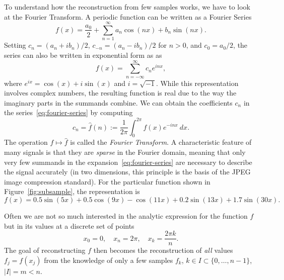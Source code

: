 \documentclass{article}
\begin{document}
To understand how the reconstruction from few samples works, we have to look at the Fourier Transform. A periodic function can be written as a Fourier Series
\begin{equation*}
 f(x) = \frac{a_0}{2}+\sum_{n=1}^\infty a_n\cos(nx)+b_n\sin(nx).
\end{equation*}
Setting $c_n=(a_n+ib_n)/2$, $c_{-n}=(a_n-ib_n)/2$ for $n>0$, and $c_0=a_0/2$, the series can also be written in exponential form as as
\begin{equation}\label{eq:fourier-series}\tag{1}
 f(x) = \sum_{n=-\infty}^\infty c_n e^{inx},
\end{equation}
where $e^{ix} = \cos(x)+i\sin(x)$ and $i=\sqrt{-1}$. While this representation involves complex numbers, the resulting function is real due to the way the imaginary parts in the summands combine. 
We can obtain the coefficients $c_n$ in the series~\eqref{eq:fourier-series} by computing
\begin{equation*}
 c_n = \hat{f}(n) := \frac{1}{2\pi} \int_0^{2\pi} f(x) e^{-inx} \ dx.
\end{equation*}
The operation $f\mapsto \hat{f}$ is called the {\em Fourier Transform}. A characteristic feature of many signals is that they are {\em sparse} in the Fourier domain, meaning that only very few summands in the expansion~\eqref{eq:fourier-series} are necessary to describe the signal accurately (in two dimensions, this principle is the basis of the JPEG image compression standard). For the particular function shown in Figure~\ref{fig:subsample}, the representation is 
\begin{equation}\label{eq:signal}\tag{2}
 f(x) = 0.5\sin(5x)+0.5\cos(9x)-\cos(11x)+0.2\sin(13x)+1.7\sin(30x).
\end{equation}

Often we are not so much interested in the analytic expression for the function $f$ but in its values at a discrete set of points
\begin{equation*}
 x_0=0, \quad x_n=2\pi, \quad x_k=\frac{2\pi k}{n}.
\end{equation*}
The goal of reconstructing $f$ then becomes the reconstruction of {\em all} values $f_j=f(x_j)$ from the knowledge of only a few samples $f_k$, $k\in I\subset \{0,\dots,n-1\}$, $|I|=m<n$. 
\end{document}
